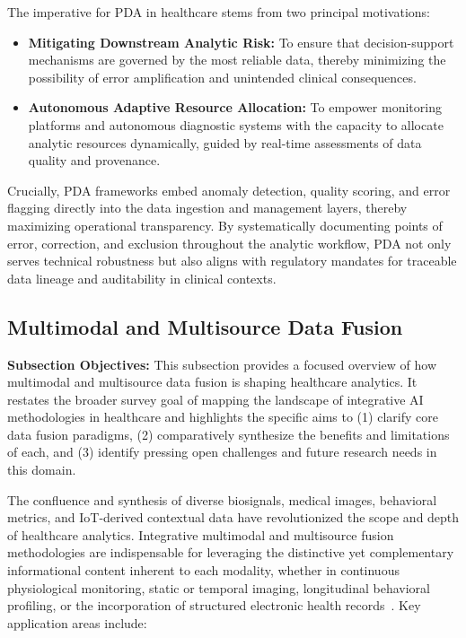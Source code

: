 \documentclass[sigconf]{acmart}
\begin{document}
The imperative for PDA in healthcare stems from two principal motivations:
\begin{itemize}
    \item \textbf{Mitigating Downstream Analytic Risk:} To ensure that decision-support mechanisms are governed by the most reliable data, thereby minimizing the possibility of error amplification and unintended clinical consequences.
    \item \textbf{Autonomous Adaptive Resource Allocation:} To empower monitoring platforms and autonomous diagnostic systems with the capacity to allocate analytic resources dynamically, guided by real-time assessments of data quality and provenance.
\end{itemize}
Crucially, PDA frameworks embed anomaly detection, quality scoring, and error flagging directly into the data ingestion and management layers, thereby maximizing operational transparency. By systematically documenting points of error, correction, and exclusion throughout the analytic workflow, PDA not only serves technical robustness but also aligns with regulatory mandates for traceable data lineage and auditability in clinical contexts.

\subsection{Multimodal and Multisource Data Fusion}

\textbf{Subsection Objectives:} This subsection provides a focused overview of how multimodal and multisource data fusion is shaping healthcare analytics. It restates the broader survey goal of mapping the landscape of integrative AI methodologies in healthcare and highlights the specific aims to (1) clarify core data fusion paradigms, (2) comparatively synthesize the benefits and limitations of each, and (3) identify pressing open challenges and future research needs in this domain.

The confluence and synthesis of diverse biosignals, medical images, behavioral metrics, and IoT-derived contextual data have revolutionized the scope and depth of healthcare analytics. Integrative multimodal and multisource fusion methodologies are indispensable for leveraging the distinctive yet complementary informational content inherent to each modality, whether in continuous physiological monitoring, static or temporal imaging, longitudinal behavioral profiling, or the incorporation of structured electronic health records~\cite{ref41,ref42,ref46,ref50,ref53,ref54,ref60,ref61,ref62,ref64,ref65,ref70,ref71,ref84,ref86,ref89,ref90,ref106,ref107}. Key application areas include:
\end{document}
